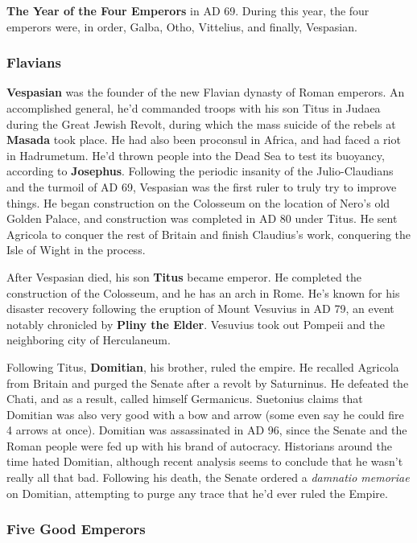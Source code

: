 \textbf{The Year of the Four Emperors} in AD 69. During this year, the four emperors were, in order,
Galba, Otho, Vittelius, and finally, Vespasian.

\subsubsection*{Flavians}

\textbf{Vespasian} was the founder of the new Flavian dynasty of Roman emperors.
An accomplished general, he'd commanded troops with his son Titus in Judaea during the Great Jewish Revolt,
during which the mass suicide of the rebels at \textbf{Masada} took place.
He had also been proconsul in Africa, and had faced a riot in Hadrumetum.
He'd thrown people into the Dead Sea to test its buoyancy, according to \textbf{Josephus}.
Following the periodic insanity of the Julio-Claudians and the turmoil of AD 69,
Vespasian was the first ruler to truly try to improve things.
He began construction on the Colosseum on the location of Nero's old Golden Palace,
and construction was completed in AD 80 under Titus.
He sent Agricola to conquer the rest of Britain and finish Claudius's work,
conquering the Isle of Wight in the process.

After Vespasian died, his son \textbf{Titus} became emperor.
He completed the construction of the Colosseum, and he has an arch in Rome.
He's known for his disaster recovery following the eruption of Mount Vesuvius in AD 79,
an event notably chronicled by \textbf{Pliny the Elder}.
Vesuvius took out Pompeii and the neighboring city of Herculaneum.

Following Titus, \textbf{Domitian}, his brother, ruled the empire.
He recalled Agricola from Britain and purged the Senate after a revolt by Saturninus.
He defeated the Chati, and as a result, called himself Germanicus.
Suetonius claims that Domitian was also very good with a bow and arrow
(some even say he could fire 4 arrows at once).
Domitian was assassinated in AD 96,
since the Senate and the Roman people were fed up with his brand of autocracy.
Historians around the time hated Domitian,
although recent analysis seems to conclude that he wasn't really all that bad.
Following his death, the Senate ordered a \textit{damnatio memoriae} on Domitian,
attempting to purge any trace that he'd ever ruled the Empire.

\subsubsection*{Five Good Emperors}


